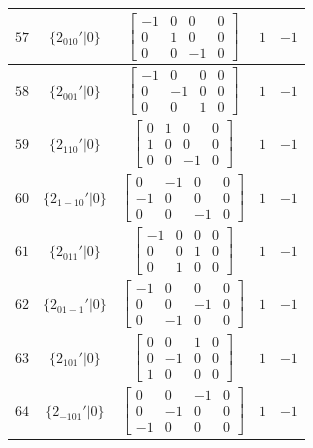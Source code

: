 \documentclass[fleqn,8pt]{jsarticle}
\begin{document}
\begin{longtable}{ccccc}
$ 57 $ & $ \{2{}_{010}{}'|0\} $ & $ \begin{bmatrix} -1 & 0 & 0 & 0 \\ 0 & 1 & 0 & 0 \\ 0 & 0 & -1 & 0 \end{bmatrix} $ & $ 1 $ & $ -1 $ \\ \hline
$ 58 $ & $ \{2{}_{001}{}'|0\} $ & $ \begin{bmatrix} -1 & 0 & 0 & 0 \\ 0 & -1 & 0 & 0 \\ 0 & 0 & 1 & 0 \end{bmatrix} $ & $ 1 $ & $ -1 $ \\ \hline
$ 59 $ & $ \{2{}_{110}{}'|0\} $ & $ \begin{bmatrix} 0 & 1 & 0 & 0 \\ 1 & 0 & 0 & 0 \\ 0 & 0 & -1 & 0 \end{bmatrix} $ & $ 1 $ & $ -1 $ \\ \hline
$ 60 $ & $ \{2{}_{1-10}{}'|0\} $ & $ \begin{bmatrix} 0 & -1 & 0 & 0 \\ -1 & 0 & 0 & 0 \\ 0 & 0 & -1 & 0 \end{bmatrix} $ & $ 1 $ & $ -1 $ \\ \hline
$ 61 $ & $ \{2{}_{011}{}'|0\} $ & $ \begin{bmatrix} -1 & 0 & 0 & 0 \\ 0 & 0 & 1 & 0 \\ 0 & 1 & 0 & 0 \end{bmatrix} $ & $ 1 $ & $ -1 $ \\ \hline
$ 62 $ & $ \{2{}_{01-1}{}'|0\} $ & $ \begin{bmatrix} -1 & 0 & 0 & 0 \\ 0 & 0 & -1 & 0 \\ 0 & -1 & 0 & 0 \end{bmatrix} $ & $ 1 $ & $ -1 $ \\ \hline
$ 63 $ & $ \{2{}_{101}{}'|0\} $ & $ \begin{bmatrix} 0 & 0 & 1 & 0 \\ 0 & -1 & 0 & 0 \\ 1 & 0 & 0 & 0 \end{bmatrix} $ & $ 1 $ & $ -1 $ \\ \hline
$ 64 $ & $ \{2{}_{-101}{}'|0\} $ & $ \begin{bmatrix} 0 & 0 & -1 & 0 \\ 0 & -1 & 0 & 0 \\ -1 & 0 & 0 & 0 \end{bmatrix} $ & $ 1 $ & $ -1 $ \\ \hline

\end{longtable}
\end{document}
